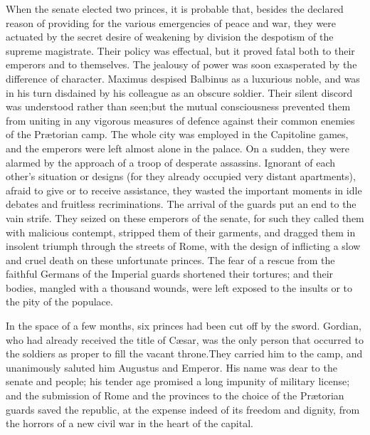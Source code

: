 When the senate elected two princes, it is probable that, besides
the declared reason of providing for the various emergencies of
peace and war, they were actuated by the secret desire of
weakening by division the despotism of the supreme magistrate.
Their policy was effectual, but it proved fatal both to their
emperors and to themselves. The jealousy of power was soon
exasperated by the difference of character. Maximus despised
Balbinus as a luxurious noble, and was in his turn disdained by
his colleague as an obscure soldier. Their silent discord was
understood rather than seen;\footnotemark[43] but the mutual consciousness
prevented them from uniting in any vigorous measures of defence
against their common enemies of the Prætorian camp. The whole
city was employed in the Capitoline games, and the emperors were
left almost alone in the palace. On a sudden, they were alarmed
by the approach of a troop of desperate assassins. Ignorant of
each other’s situation or designs (for they already occupied very
distant apartments), afraid to give or to receive assistance,
they wasted the important moments in idle debates and fruitless
recriminations. The arrival of the guards put an end to the vain
strife. They seized on these emperors of the senate, for such
they called them with malicious contempt, stripped them of their
garments, and dragged them in insolent triumph through the
streets of Rome, with the design of inflicting a slow and cruel
death on these unfortunate princes. The fear of a rescue from the
faithful Germans of the Imperial guards shortened their tortures;
and their bodies, mangled with a thousand wounds, were left
exposed to the insults or to the pity of the populace.\footnotemark[44]



In the space of a few months, six princes had been cut off by the
sword. Gordian, who had already received the title of Cæsar, was
the only person that occurred to the soldiers as proper to fill
the vacant throne.\footnotemark[45] They carried him to the camp, and
unanimously saluted him Augustus and Emperor. His name was dear
to the senate and people; his tender age promised a long impunity
of military license; and the submission of Rome and the provinces
to the choice of the Prætorian guards saved the republic, at the
expense indeed of its freedom and dignity, from the horrors of a
new civil war in the heart of the capital.\footnotemark[46]

